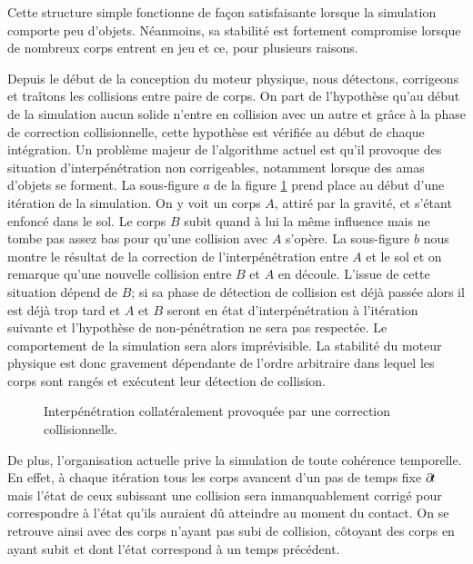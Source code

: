 Cette structure simple fonctionne de façon satisfaisante lorsque la
simulation comporte peu d'objets. Néanmoins, sa stabilité est
fortement compromise lorsque de nombreux corps entrent en jeu et ce,
pour plusieurs raisons.

Depuis le début de la conception du moteur physique, nous détectons,
corrigeons et traîtons les collisions entre paire de corps. On part de
l'hypothèse qu'au début de la simulation aucun solide n'entre en
collision avec un autre et grâce à la phase de correction
collisionnelle, cette hypothèse est vérifiée au début de chaque
intégration. Un problème majeur de l'algorithme actuel est qu'il
provoque des situation d'interpénétration non corrigeables, notamment
lorsque des amas d'objets se forment. La sous-figure $a$ de la figure
\ref{probleme} prend place au début d'une itération de la simulation.
On y voit un corps $A$, attiré par la gravité, et s'étant enfoncé dans
le sol. Le corps $B$ subit quand à lui la même influence mais ne tombe
pas assez bas pour qu'une collision avec $A$ s'opère. La sous-figure
$b$ nous montre le résultat de la correction de l'interpénétration
entre $A$ et le sol et on remarque qu'une nouvelle collision entre $B$
et $A$ en découle. L'issue de cette situation dépend de $B$; si sa
phase de détection de collision est déjà passée alors il est déjà trop
tard et $A$ et $B$ seront en état d'interpénétration à l'itération
suivante et l'hypothèse de non-pénétration ne sera pas respectée. Le
comportement de la simulation sera alors imprévisible. La stabilité du
moteur physique est donc gravement dépendante de l'ordre arbitraire
dans lequel les corps sont rangés et exécutent leur détection de
collision.

\begin{figure}
  \centering
  \subfloat[]{  }
  \subfloat[]{  }
  \caption{Interpénétration collatéralement provoquée par une correction collisionnelle.}
  \label{probleme}
\end{figure}

De plus, l'organisation actuelle prive la simulation de toute
cohérence temporelle. En effet, à chaque itération tous les corps
avancent d'un pas de temps fixe $\partial \! t$ mais l'état de ceux
subissant une collision sera inmanquablement corrigé pour correspondre
à l'état qu'ils auraient dû atteindre au moment du contact. On se
retrouve ainsi avec des corps n'ayant pas subi de collision, côtoyant
des corps en ayant subit et dont l'état correspond à un temps
précédent.

